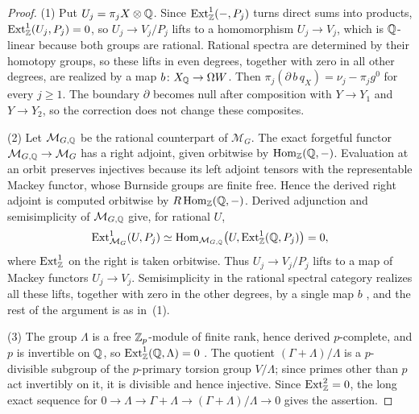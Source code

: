 \begin{proof}
(1) Put $U_j=\pi_jX\otimes\mathbb Q$.
Since $\operatorname{Ext}^1_\mathbb Z(-,P_j)$ turns direct sums into products, $\operatorname{Ext}^1_\mathbb Z(U_j,P_j)=0$, so $U_j\to V_j/P_j$ lifts to a homomorphism $U_j\to V_j$, which is $\mathbb Q$-linear because both groups are rational.
Rational spectra are determined by their homotopy groups, so these lifts in even degrees, together with zero in all other degrees, are realized by a map $b\colon X_\mathbb Q\to\Omega W$.
Then $\pi_j(\partial\,b\,q_X)=\nu_j-\pi_jg^0$ for every $j\ge1$.
The boundary $\partial$ becomes null after composition with $Y\to Y_1$ and $Y\to Y_2$, so the correction does not change these composites.

(2) Let $\mathcal M_{G,\mathbb Q}$ be the rational counterpart of $\mathcal M_G$.
The exact forgetful functor $\mathcal M_{G,\mathbb Q}\to\mathcal M_G$ has a right adjoint, given orbitwise by $\operatorname{Hom}_\mathbb Z(\mathbb Q,-)$.
Evaluation at an orbit preserves injectives because its left adjoint tensors with the representable Mackey functor, whose Burnside groups are finite free.
Hence the derived right adjoint is computed orbitwise by $R\operatorname{Hom}_\mathbb Z(\mathbb Q,-)$.
Derived adjunction and semisimplicity of $\mathcal M_{G,\mathbb Q}$ give, for rational $U$,
\[
 \operatorname{Ext}^1_{\mathcal M_G}(U,P_j)
 \simeq \operatorname{Hom}_{\mathcal M_{G,\mathbb Q}}
 \bigl(U,\operatorname{Ext}^1_\mathbb Z(\mathbb Q,P_j)\bigr)=0,
\]
where $\operatorname{Ext}^1_\mathbb Z$ on the right is taken orbitwise.
Thus $U_j\to V_j/P_j$ lifts to a map of Mackey functors $U_j\to V_j$.
Semisimplicity in the rational spectral category realizes all these lifts, together with zero in the other degrees, by a single map $b$ \cite{BarnesRational2009}, and the rest of the argument is as in~(1).

(3) The group $\Lambda$ is a free $\mathbb Z_p$-module of finite rank, hence derived $p$-complete, and $p$ is invertible on $\mathbb Q$, so $\operatorname{Ext}^1_\mathbb Z(\mathbb Q,\Lambda)=0$ \cite[Tag 091N]{StacksProject}.
The quotient $(\Gamma+\Lambda)/\Lambda$ is a $p$-divisible subgroup of the $p$-primary torsion group $V/\Lambda$; since primes other than $p$ act invertibly on it, it is divisible and hence injective.
Since $\operatorname{Ext}^2_\mathbb Z=0$, the long exact sequence for $0\to\Lambda\to\Gamma+\Lambda\to(\Gamma+\Lambda)/\Lambda\to0$ gives the assertion.
\end{proof}

